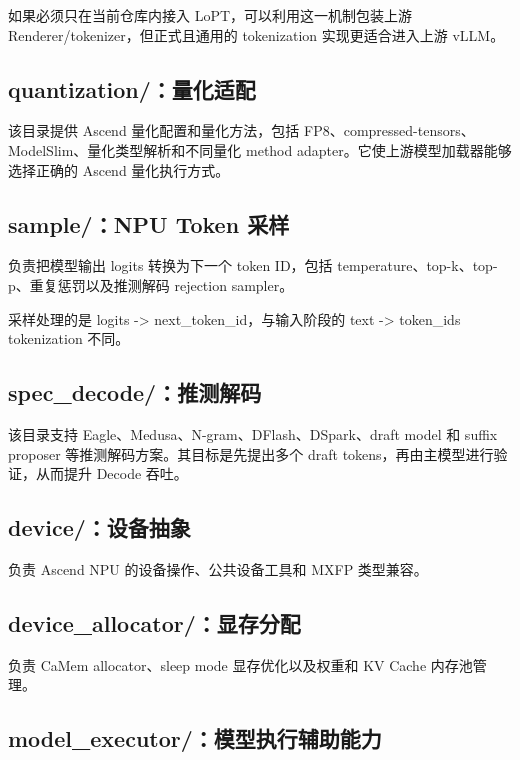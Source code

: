 \documentclass[UTF8,11pt,a4paper]{ctexart}
\DeclareRobustCommand{\folder}[1]{\texttt{\detokenize{#1}}}
\DeclareRobustCommand{\code}[1]{\texttt{\detokenize{#1}}}
\def\folder#1{#1}%
\def\code#1{#1}%
\begin{document}
如果必须只在当前仓库内接入 LoPT，可以利用这一机制包装上游 Renderer/tokenizer，但正式且通用的 tokenization 实现更适合进入上游 vLLM。

\subsection{\folder{quantization/}：量化适配}

该目录提供 Ascend 量化配置和量化方法，包括 FP8、compressed-tensors、ModelSlim、量化类型解析和不同量化 method adapter。它使上游模型加载器能够选择正确的 Ascend 量化执行方式。

\subsection{\folder{sample/}：NPU Token 采样}

负责把模型输出 logits 转换为下一个 token ID，包括 temperature、top-k、top-p、重复惩罚以及推测解码 rejection sampler。

采样处理的是 \code{logits -> next_token_id}，与输入阶段的 \code{text -> token_ids} tokenization 不同。

\subsection{\folder{spec_decode/}：推测解码}

该目录支持 Eagle、Medusa、N-gram、DFlash、DSpark、draft model 和 suffix proposer 等推测解码方案。其目标是先提出多个 draft tokens，再由主模型进行验证，从而提升 Decode 吞吐。

\subsection{\folder{device/}：设备抽象}

负责 Ascend NPU 的设备操作、公共设备工具和 MXFP 类型兼容。

\subsection{\folder{device_allocator/}：显存分配}

负责 CaMem allocator、sleep mode 显存优化以及权重和 KV Cache 内存池管理。

\subsection{\folder{model_executor/}：模型执行辅助能力}
\end{document}
